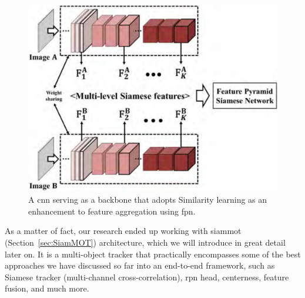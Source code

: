 \begin{figure}[!t]
    \centerline{\includegraphics[width=0.6\linewidth]{figures/theoretical_foundations/feature_pyramid_siamese_network.png}}
    \caption[\Gls{fpsn} architecture]{A \gls{cnn} serving as a backbone that adopts Similarity learning as an enhancement to feature aggregation using \gls{fpn}. }
    \label{fig:FeaturePyramidSiameseNetwork}
\end{figure}

As a matter of fact, our research ended up working with \gls{siammot}~\cite{shuai2021siammot} (Section~\ref{sec:SiamMOT}) architecture, which we will introduce in great detail later on. It is a multi-object tracker that practically encompasses some of the best approaches we have discussed so far into an end-to-end framework, such as Siamese tracker (multi-channel cross-correlation), \gls{rpn} head, centerness, feature fusion, and much more.

